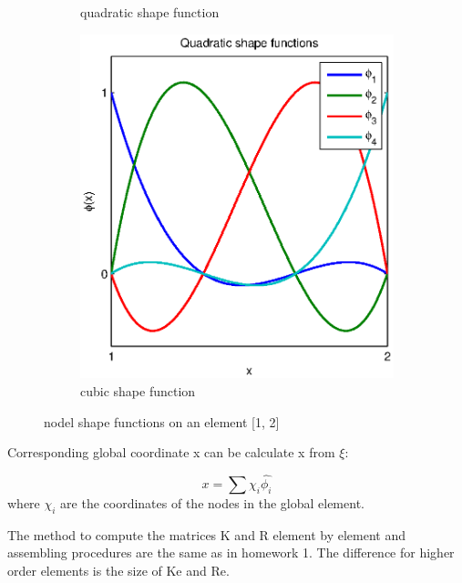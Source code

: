 \documentclass[paper=a4, fontsize=11pt]{article} %
\begin{document}
\begin{figure}
\begin{subfigure}[b]{0.6\textwidth}
                \caption{quadratic shape function}
                \label{fig:quad_shape}
        \end{subfigure}
        \begin{subfigure}[b]{0.6\textwidth}
                \includegraphics[width=\textwidth]{cubic_shape_function.eps}
                \caption{cubic shape function}
                \label{fig:cub_shape}
        \end{subfigure}

        \caption{nodel shape functions on an element [1, 2]}\label{fig:shape}
\end{figure}


Corresponding global coordinate x can be calculate x from $\xi$:

\begin{equation}
x = \sum{\chi _i \hat{\phi _i}}
\end{equation} 
where $\chi_i$ are the coordinates of the nodes in the global element. 

The method to compute the matrices K and R element by element and assembling procedures are the same as in homework 1. The difference for higher order elements is the size of Ke and Re.   
\end{document}
